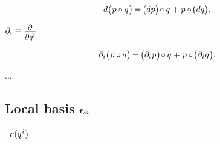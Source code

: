\nopagebreak\vspace{-0.4em}
\begin{equation}\label{theproductrule.differentiation}
d \bigl( \hspace{.15ex} p \circ q \hspace{.1ex} \bigr)
\hspace{-0.2ex} = \hspace{-0.2ex}
\bigl( dp \bigr) \hspace{-0.3ex} \circ q \hspace{.1ex} + \hspace{.1ex} p \circ \hspace{-0.3ex} \bigl( dq \bigr)
.
\end{equation}

${ \partial_i \equiv \scalebox{.9}{$ \displaystyle\frac{\raisebox{-0.2em}{$\partial$}}{\raisebox{-0.1em}{$\partial q^i$}} $} }$

\nopagebreak\vspace{-0.4em}
\begin{equation}\label{theproductrule.partialderivative}
\partial_i \bigl( \hspace{.15ex} p \circ q \hspace{.1ex} \bigr)
\hspace{-0.2ex} = \hspace{-0.2ex}
\bigl( \partial_i \hspace{.1ex} p \hspace{.1ex} \bigr) \hspace{-0.3ex} \circ q \hspace{.12ex} +
\hspace{.1ex} p \circ \hspace{-0.3ex} \bigl( \partial_i \hspace{.1ex} q \hspace{.1ex} \bigr)
.
\end{equation}

...

\subsection*{%
Local basis
${\locationvector_\differentialindex{i}}$%
}

~${\bm{r}(q^{\hspace{.1ex}i}\hspace{.1ex})}$

